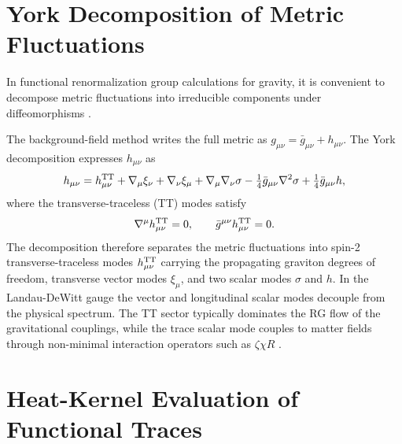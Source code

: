 \documentclass[12pt,a4paper]{article}
\begin{document}
\section{York Decomposition of Metric Fluctuations}
\label{app:york}

In functional renormalization group calculations for gravity, it is convenient
to decompose metric fluctuations into irreducible components under
diffeomorphisms \cite{Reuter1998,Percacci2017}.

The background-field method writes the full metric as
$g_{\mu\nu} = \bar g_{\mu\nu} + h_{\mu\nu}$. The York decomposition expresses
$h_{\mu\nu}$ as
\begin{equation}
h_{\mu\nu}
=
h_{\mu\nu}^{\rm TT}
+\nabla_\mu \xi_\nu + \nabla_\nu \xi_\mu
+\nabla_\mu \nabla_\nu \sigma
-\tfrac{1}{4}\bar g_{\mu\nu} \nabla^2 \sigma
+\tfrac{1}{4}\bar g_{\mu\nu} h,
\end{equation}
where the transverse-traceless (TT) modes satisfy
\begin{equation}
\nabla^\mu h_{\mu\nu}^{\rm TT} = 0, \qquad
\bar g^{\mu\nu} h_{\mu\nu}^{\rm TT} = 0.
\end{equation}
The decomposition therefore separates the metric fluctuations into spin-2
transverse-traceless modes $h_{\mu\nu}^{\rm TT}$ carrying the propagating
graviton degrees of freedom, transverse vector modes $\xi_\mu$, and two
scalar modes $\sigma$ and $h$. In the Landau-DeWitt gauge the vector and
longitudinal scalar modes decouple from the physical spectrum. The TT sector
typically dominates the RG flow of the gravitational couplings, while the
trace scalar mode couples to matter fields through non-minimal interaction
operators such as $\zeta\chi R$ \cite{EichhornLinoWagner2023}.

\section{Heat-Kernel Evaluation of Functional Traces}
\label{app:heatkernel}
\end{document}
